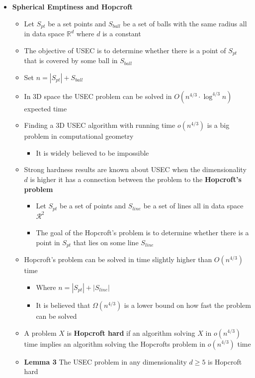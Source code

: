 \documentclass[11pt]{article}
\begin{document}
\begin{itemize}
\item \textbf{Spherical Emptiness and Hopcroft}
\begin{itemize}
\item Let \(S_{pt}\) be a set points and \(S_{ball}\) be a set of balls with the same radius all in data space \(\mathbb R^d\) where \(d\) is a constant
\item The objective of USEC is to determine whether there is a point of \(S_{pt}\) that is covered by some ball in \(S_{ball}\)
\item Set \(n = |S_{pt}| + S_{ball}\)
\item In 3D space the USEC problem can be solved in \(O(n^{4/3} \cdot \log^{4/3} n)\) expected time
\item Finding a 3D USEC algorithm with running time \(o(n^{4/3})\) is a big problem in computational geometry
\begin{itemize}
\item It is widely believed to be impossible
\end{itemize}
\item Strong hardness results are known about USEC when the dimensionality \(d\) is higher it has a connection between the problem to the \textbf{Hopcroft's problem}
\begin{itemize}
\item Let \(S_{pt}\) be a set of points and \(S_{line}\) be a set of lines all in data space \(\mathcal R^2\)
\item The goal of the Hopcroft's problem is to determine whether there is a point in \(S_{pt}\) that lies on some line \(S_{line}\)
\end{itemize}
\item Hopcroft's problem can be solved in time slightly higher than \(O(n^{4/3})\) time
\begin{itemize}
\item Where \(n = |S_{pt}| + |S_{line}|\)
\item It is believed that \(\Omega (n^{4/3})\) is a lower bound on how fast the problem can be solved
\end{itemize}
\item A problem \(X\) is \textbf{Hopcroft hard} if an algorithm solving \(X\) in \(o(n^{4/3})\) time implies an algorithm solving the Hopcrofts problem in \(o(n^{4/3})\) time
\item \textbf{Lemma 3} The USEC problem in any dimensionality \(d \geq 5\) is Hopcroft hard
\end{itemize}
\end{itemize}
\end{document}
